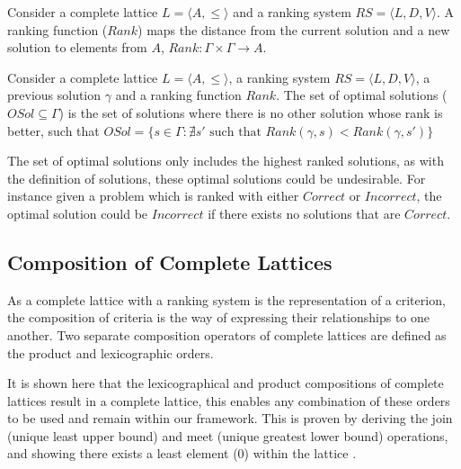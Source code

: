 \begin{defs}
Consider a complete lattice $L = \langle A, \leq \rangle$ and a ranking system $RS = \langle L, D, V \rangle$.
A ranking function ($Rank$) maps the distance from the current solution and a new solution to elements from $A$,
$Rank: \Gamma \times \Gamma \rightarrow A$.
\end{defs}

\begin{defs}
Consider a complete lattice $L = \langle A, \leq \rangle$, a ranking system $RS = \langle L, D, V \rangle$, a previous solution $\gamma$ and a ranking function $Rank$.
The set of optimal solutions ($OSol \subseteq \Gamma$) is the set of solutions where there is no other solution whose rank is better,
such that $OSol = \{ s \in \Gamma : \nexists s' \mbox{ such that } Rank(\gamma,s) < Rank(\gamma,s')\}$
\end{defs}

The set of optimal solutions only includes the highest ranked solutions,
as with the definition of solutions, these optimal solutions could be undesirable.
For instance given a problem which is ranked with either $Correct$ or $Incorrect$, 
the optimal solution could be $Incorrect$ if there exists no solutions that are $Correct$. 

\subsection{Composition of Complete Lattices}
\label{sec:composition}
As a complete lattice with a ranking system is the representation of a criterion,
the composition of criteria is the way of expressing their relationships to one another. 
Two separate composition operators of complete lattices are defined as the product and lexicographic orders.

It is shown here that the lexicographical and product compositions of complete lattices result in a complete lattice,
this enables any combination of these orders to be used and remain within our framework.
This is proven by deriving the join (unique least upper bound) and meet (unique greatest lower bound) operations,
and showing there exists a least element ($0$) within the lattice \cite{davey1990introduction}. 

